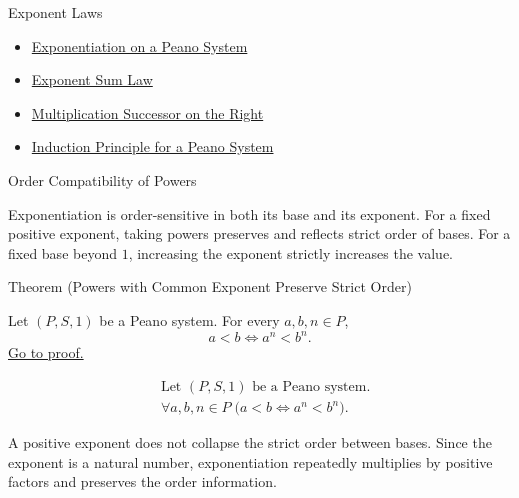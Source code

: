 \begin{topicbox}{Exponent Laws}
\begin{dependencies}
\begin{itemize}
  \item \hyperref[def:exponentiation-on-peano-system]{Exponentiation on a Peano System}
  \item \hyperref[thm:exponent-sum-law]{Exponent Sum Law}
  \item \hyperref[thm:multiplication-successor-on-right]{Multiplication Successor on the Right}
  \item \hyperref[thm:induction-principle-for-peano-system]{Induction Principle for a Peano System}
\end{itemize}
\end{dependencies}
\end{topicbox}

\begin{topicbox}{Order Compatibility of Powers}
\begin{exposition}
Exponentiation is order-sensitive in both its base and its exponent. For a
fixed positive exponent, taking powers preserves and reflects strict order of
bases. For a fixed base beyond $1$, increasing the exponent strictly increases
the value.
\end{exposition}

\begin{theorembox}{Theorem (Powers with Common Exponent Preserve Strict Order)}
\begin{theorem}
\label{thm:powers-with-common-exponent-preserve-strict-order}
Let $(P,S,1)$ be a Peano system. For every $a,b,n \in P$,
\[
a<b
\Longleftrightarrow
a^n<b^n.
\]
\hyperref[prf:powers-with-common-exponent-preserve-strict-order]{Go to proof.}
\end{theorem}
\end{theorembox}

\begin{remark*}
\[
\begin{aligned}
&\text{Let } (P,S,1) \text{ be a Peano system.}\\
&\forall a,b,n \in P\;\bigl(a<b \Longleftrightarrow a^n<b^n\bigr).
\end{aligned}
\]
\end{remark*}

\begin{remark*}[Interpretation]
A positive exponent does not collapse the strict order between bases. Since
the exponent is a natural number, exponentiation repeatedly multiplies by
positive factors and preserves the order information.
\end{remark*}


\end{topicbox}
